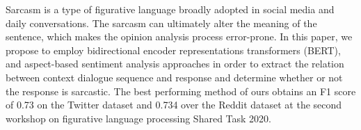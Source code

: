 Sarcasm is a type of figurative language broadly adopted in social media and daily conversations. The sarcasm can ultimately alter the meaning of the sentence, which makes the opinion analysis process error-prone. In this paper, we propose to employ bidirectional encoder representations transformers (BERT), and aspect-based sentiment analysis approaches in order to extract the relation between context dialogue sequence and response and determine whether or not the response is sarcastic. The best performing method of ours obtains an F1 score of 0.73 on the Twitter dataset and 0.734 over the Reddit dataset at the second workshop on figurative language processing Shared Task 2020.
